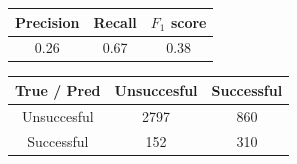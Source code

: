 \begin{center}
    \begin{tabular}{|c|c|c|}
        \hline
        Precision & Recall & \(F_1\) score \\
        \hline
        0.26 & 0.67 & 0.38 \\
        \hline
    \end{tabular}
    \quad     
    \begin{tabular}{|c|c|c|}
        \hline
         True / Pred & Unsuccesful & Successful \\
        \hline
        Unsuccesful & 2797 & 860 \\
        \hline
        Successful & 152 & 310\\
        \hline
    \end{tabular}
\end{center}

